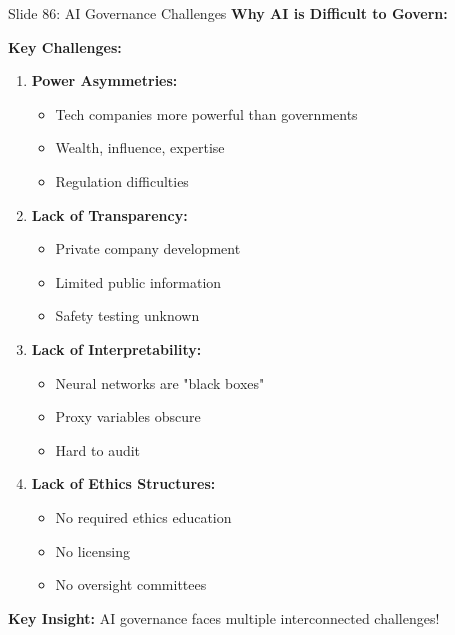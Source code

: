 \documentclass[8pt]{beamer}
\begin{document}
	
	\begin{frame}{Slide 86: AI Governance Challenges}
		\fontsize{6.5}{7.5}\selectfont
		\textbf{Why AI is Difficult to Govern:}
		
		\vspace{0.1cm}
		\textbf{Key Challenges:}
		\begin{enumerate}
			\item \textbf{Power Asymmetries:}
			\begin{itemize}
				\item Tech companies more powerful than governments
				\item Wealth, influence, expertise
				\item Regulation difficulties
			\end{itemize}
			\item \textbf{Lack of Transparency:}
			\begin{itemize}
				\item Private company development
				\item Limited public information
				\item Safety testing unknown
			\end{itemize}
			\item \textbf{Lack of Interpretability:}
			\begin{itemize}
				\item Neural networks are "black boxes"
				\item Proxy variables obscure
				\item Hard to audit
			\end{itemize}
			\item \textbf{Lack of Ethics Structures:}
			\begin{itemize}
				\item No required ethics education
				\item No licensing
				\item No oversight committees
			\end{itemize}
		\end{enumerate}
		
		\textcolor{myblue}{\textbf{Key Insight:}} AI governance faces \textcolor{myblue}{multiple interconnected challenges}!
	\end{frame}
	
\end{document}
